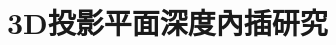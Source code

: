 \section{3D投影平面深度內插研究}
                                                                                                                                                                                                                                                                                                                                                                                                                                                                                                                                                                                                                                                                                                                                                                                                                                                                                                                                                                                                                                                                                                                                                                                                                                                                                                                                                                                                                                                                                                                                                                                                                                                                                                                                                                                                                                                                                                                                                                                                                                                                                                                                                                                                                                                                                                                                                                                                                                                                                                                                                                                                                                                                                                                                                                                                                                                                                                                                                                                                                                                                                                                                                                                                                            
